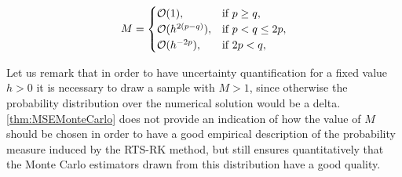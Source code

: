 \documentclass[10pt]{article}
\begin{document}
\begin{equation}
	M = \begin{cases} \mathcal{O}(1), & \mbox{if } p \geq q, \\
	\mathcal{O}(h^{2(p-q)}), & \mbox{if } p < q \leq 2p,\\
	\mathcal{O}(h^{-2p}), & \mbox{if } 2p < q,
	\end{cases}
\end{equation}
\begin{remark} Let us remark that in order to have uncertainty quantification for a fixed value $h > 0$ it is necessary to draw a sample with $M > 1$, since otherwise the probability distribution over the numerical solution would be a  delta. \cref{thm:MSEMonteCarlo} does not provide an indication of how the value of $M$ should be chosen in order to have a good empirical description of the probability measure induced by the RTS-RK method, but still ensures quantitatively that the Monte Carlo estimators drawn from this distribution have a good quality. 
\end{remark}
\end{document}
